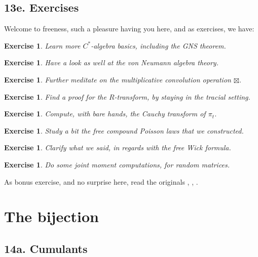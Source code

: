 \documentclass[12pt]{amsbook}
\newtheorem{exercise}[theorem]{Exercise}
\begin{document}
\section*{13e. Exercises}

Welcome to freeness, such a pleasure having you here, and as exercises, we have:

\begin{exercise}
Learn more $C^*$-algebra basics, including the GNS theorem.
\end{exercise}

\begin{exercise}
Have a look as well at the von Neumann algebra theory.
\end{exercise}

\begin{exercise}
Further meditate on the multiplicative convolution operation $\boxtimes$.
\end{exercise}

\begin{exercise}
Find a proof for the $R$-transform, by staying in the tracial setting.
\end{exercise}

\begin{exercise}
Compute, with bare hands, the Cauchy transform of $\pi_t$.
\end{exercise}

\begin{exercise}
Study a bit the free compound Poisson laws that we constructed.
\end{exercise}

\begin{exercise}
Clarify what we said, in regards with the free Wick formula.
\end{exercise}

\begin{exercise}
Do some joint moment computations, for random matrices.
\end{exercise}

As bonus exercise, and no surprise here, read the originals \cite{vo1}, \cite{vo2}, \cite{vo3}.

\chapter{The bijection}

\section*{14a. Cumulants}
\end{document}
